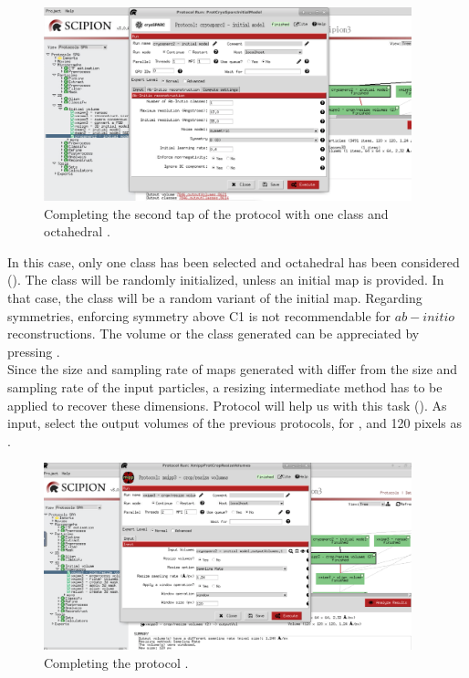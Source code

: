 \begin{figure}[H]
  \centering
  \captionsetup{width=.8\linewidth} 
  \includegraphics[width=0.95\textwidth]
  {images/8a_cryosparc2_initialmodel.pdf}
  \caption{Completing the second tap of the protocol  with one  class and octahedral .}
  \label{fig:initial_vol_1}
  \end{figure}
  
In this case, only one  class has been selected and octahedral  has been considered (). The  class will be randomly initialized, unless an initial map is provided. In that case, the class will be a random variant of the initial map. Regarding symmetries, enforcing symmetry above C1 is not recommendable for $ab-initio$ reconstructions. The volume or the  class generated can be appreciated by pressing .\\

Since the size and sampling rate of maps generated with  differ from the size and sampling rate of the input particles, a resizing intermediate method has to be applied to recover these dimensions. Protocol  will help us with this task (). As input, select the output volume\/s of the previous protocols,  for , and 120 pixels as .

\begin{figure}[H]
  \centering
  \captionsetup{width=.8\linewidth} 
  \includegraphics[width=0.95\textwidth]
  {images/8e_xmipp3_cropRS.pdf}
  \caption{Completing the protocol .}
  \label{fig:crop_resize}
  \end{figure}

